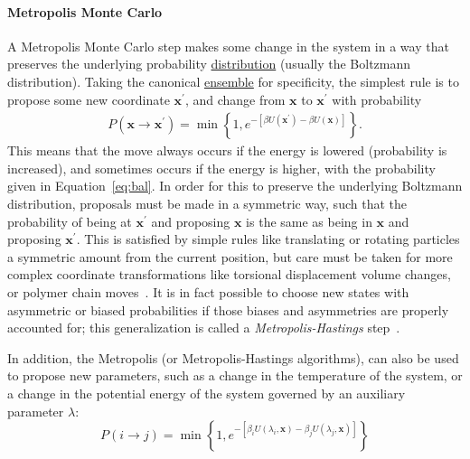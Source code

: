 \documentclass[9pt,review]{livecoms}
\newcommand{\vx}{\mathbf{x}}
\begin{document}
\hypertarget{ref:MetropolisMonteCarlo} {\paragraph{Metropolis Monte Carlo}}
A Metropolis Monte Carlo step makes some change in the system in a way that preserves the underlying probability \hyperlink{ref:Distribution} {distribution} (usually the Boltzmann distribution).  Taking the canonical \hyperlink{ref:Ensemble} {ensemble} for specificity, the simplest rule is to propose some new coordinate $\vx^\prime$, and change from $\vx$ to $\vx^\prime$ with probability
\begin{eqnarray}
P(\vx\rightarrow \vx^\prime) = \min\left\{1, e^{-\left[\beta U(\vx^\prime)-\beta U(\vx)\right]}\right\}.
\label{eq:bal}
\end{eqnarray}
This means that the move always occurs if the energy is lowered (probability is increased), and sometimes occurs if the energy is higher, with the probability given in Equation~\ref{eq:bal}.
In order for this to preserve the underlying Boltzmann distribution, proposals must be made in a symmetric way, such that the probability of being at $\vx^\prime$ and proposing $\vx$ is the same as being in $\vx$ and proposing $\vx^\prime$. This is satisfied by simple rules like translating or rotating particles a symmetric amount from the current position, but care must be taken for more complex coordinate transformations like torsional displacement volume changes, or polymer chain moves~\cite{Siepmann_mp_1992}.  It is in fact possible to choose new states with asymmetric or biased probabilities if those biases and asymmetries are properly accounted for; this generalization is called a \emph{Metropolis-Hastings} step~\cite{Hastings_biometrika_1970}.

In addition, the Metropolis (or Metropolis-Hastings algorithms), can also be used to propose new parameters, such as a change in the temperature of the system, or a change in the potential energy of the system governed by an auxiliary parameter $\lambda$:
\begin{equation}
    P(i\rightarrow j) = \min\left\{1,e^{-\left[\beta_i U(\lambda_i,\vx)-\beta_j U(\lambda_j,\vx)\right]}\right\}
\end{equation}
\end{document}
